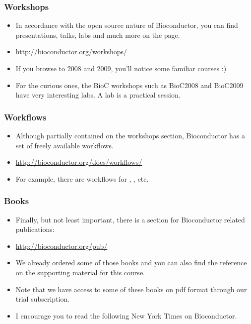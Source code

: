 \begin{frame}[allowframebreaks]
  \frametitle{Workshops}
  \begin{itemize}
  \item In accordance with the open source nature of Bioconductor, you can find presentations, talks, labs and much more on the  page.
  \item \url{http://bioconductor.org/workshops/}
  \item If you browse to 2008 and 2009, you'll notice some familiar courses :)
  \item For the curious ones, the BioC workshops such as BioC2008 and BioC2009 have very interesting labs. A lab is a practical session.
  \end{itemize}
\end{frame}

\begin{frame}[allowframebreaks]
  \frametitle{Workflows}
  \begin{itemize}
  \item Although partially contained on the workshops section, Bioconductor has a set of freely available workflows.
  \item \url{http://bioconductor.org/docs/workflows/}
  \item For example, there are workflows for , , etc.
  \end{itemize}
\end{frame}

\begin{frame}[allowframebreaks]
  \frametitle{Books}
  \begin{itemize}
  \item Finally, but not least important, there is a section for Bioconductor related publications:
  \item \url{http://bioconductor.org/pub/}
  \item We already ordered some of those books and you can also find the reference on the supporting material for this course.
  \item \alert{Note} that we  have access to some of these books on pdf format through our  trial subscription. 
  \item I encourage you to read the following New York Times  on Bioconductor.
  \end{itemize}
\end{frame}

